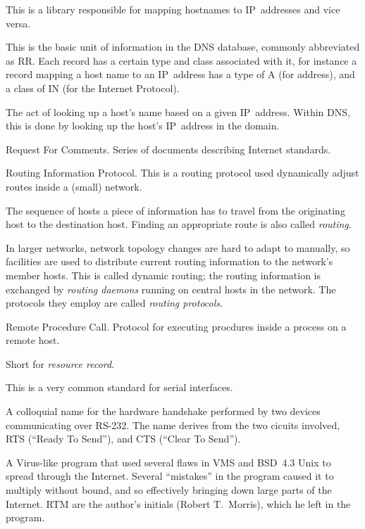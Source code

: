\documentclass[11pt,makeidx]{report}
\def\emph#1{{\em{#1}}}
\begin{document}
{\begin{dispitems}
\ditem[resolver]
	This is a library responsible for mapping hostnames to
	IP~addresses and vice versa.

	This is the basic unit of information in the DNS database, 
	commonly abbreviated as RR.
	Each record has a certain type and class associated with it,
	for instance a record mapping a host name to an IP~address
	has a type of A (for address), and a class of IN
	(for the Internet Protocol).

	The act of looking up a host's name based on a given IP~address.
	Within DNS, this is done by looking up the host's IP~address
	in the  domain.

\ditem[RFC]
        Request For Comments. Series of documents describing
        Internet standards.

\ditem[RIP]
        Routing Information Protocol. This is a routing protocol used
        dynamically adjust routes inside a (small) network.

\ditem[route]
	The sequence of hosts a piece of information has to travel
	from the originating host to the destination host. Finding
	an appropriate route is also called \emph{routing}.

	In larger networks, network topology changes are hard to adapt
	to manually, so facilities are used to distribute current
	routing information to the network's member hosts. This is
	called dynamic routing; the routing information is exchanged
	by \emph{routing daemons} running on central hosts in the network.
	The protocols they employ are called \emph{routing protocols}.

\ditem[RPC]
        Remote Procedure Call. Protocol for executing procdures inside
        a process on a remote host.

\ditem[RR]
	Short for \emph{resource record}.

\ditem[RS-232]
	This is a very common standard for serial interfaces.

	A colloquial name for the hardware handshake performed by
	two devices communicating over RS-232. The name derives from
	the two cicuits involved, RTS (``Ready To Send''), and
	CTS (``Clear To Send'').

	A Virus-like program that used several flaws in VMS and
	BSD~4.3 Unix to spread through the Internet. Several ``mistakes''
	in the program caused it to multiply without bound, and so
	effectively bringing down large parts of the Internet.
	RTM are the author's initials (Robert T.~Morris), which he left
	in the program.


\end{dispitems}}
\end{document}
